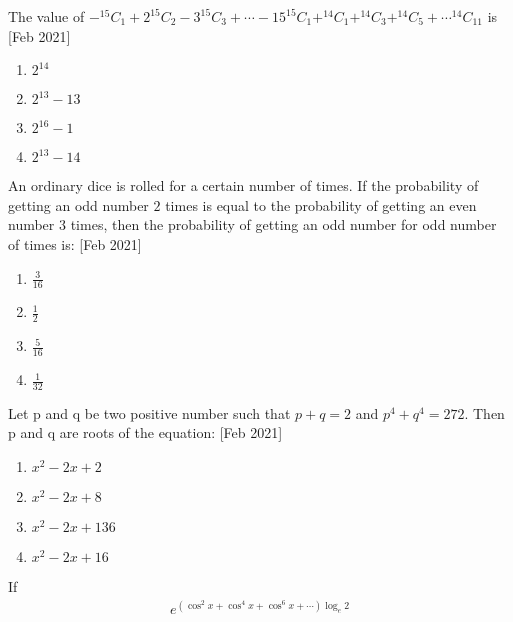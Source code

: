 \iffalse
\title{Assignment}
\author{ee24btech11064}
\section{mcq-single}
\fi

\item The value of $-^{15}C_{1}+2^{15}C_{2}-3^{15}C_{3}+\cdots -15^{15}C_{1}+^{14}C_{1}+^{14}C_{3}+^{14}C_{5}+\cdots^{14}C_{11}$ is \hfill[Feb 2021]
\begin{multicols}{2}
\begin{enumerate}
    \item $2^{14}$
    \item $2^{13}-13$
    \item $2^{16}-1$
    \item $2^{13}-14$ 
\end{enumerate}
\end{multicols}
\item An ordinary dice is rolled for a certain number of times. If the probability of getting an odd number $2$ times is equal to the probability of getting an even number $3$ times, then the probability of getting an odd number for odd number of times is: \hfill[Feb 2021]
\begin{multicols}{2}
\begin{enumerate}
    \item $\frac{3}{16}$
    \item $\frac{1}{2}$
    \item $\frac{5}{16}$
    \item $\frac{1}{32}$
\end{enumerate}
\end{multicols}
\item Let p and q be two positive number such that $p+q=2$ and $p^4+q^4=272$. Then p and q are roots of the equation: \hfill[Feb 2021]
\begin{multicols}{2}
\begin{enumerate}
       \item $x^2-2x+2$
       \item $x^2-2x+8$
       \item $x^2-2x+136$
       \item $x^2-2x+16$
\end{enumerate}
\end{multicols}
\item If 
\begin{align*}
    e^{\left(\cos^2{x} + \cos^4{x} + \cos^6{x} + \cdots \right) \log_e 2}
\end{align*} 
